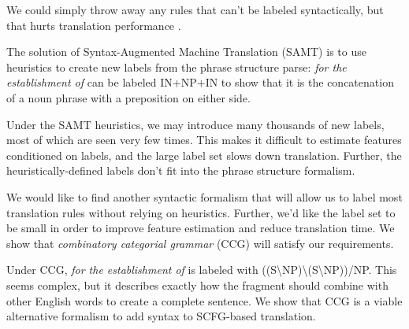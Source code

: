\documentclass[a4paper]{article}
\begin{document}
We could simply throw away any rules that can't be labeled syntactically, but that hurts translation performance \cite{koehn-och-marcu-2003,deneefe-syntax-and-phrase-mt}.

The solution of Syntax-Augmented Machine Translation (SAMT) \cite{samt-wmt06} is to use heuristics to create new labels from the phrase structure parse: {\em for the establishment of} can be labeled IN+NP+IN to show that it is the concatenation of a noun phrase with a preposition on either side.

Under the SAMT heuristics, we may introduce many thousands of new labels, most of which are seen very few times. This makes it difficult to estimate features conditioned on labels, and the large label set slows down translation. Further, the heuristically-defined labels don't fit into the phrase structure formalism.

We would like to find another syntactic formalism that will allow us to label most translation rules without relying on heuristics. Further, we'd like the label set to be small in order to improve feature estimation and reduce translation time. We show that {\em combinatory categorial grammar} (CCG) will satisfy our requirements.

Under CCG, {\em for the establishment of} is labeled with ((S\textbackslash NP)\textbackslash (S\textbackslash NP))/NP. This seems complex, but it describes exactly how the fragment should combine with other English words to create a complete sentence. We show that CCG is a viable alternative formalism to add syntax to SCFG-based translation.

%

\end{document}
